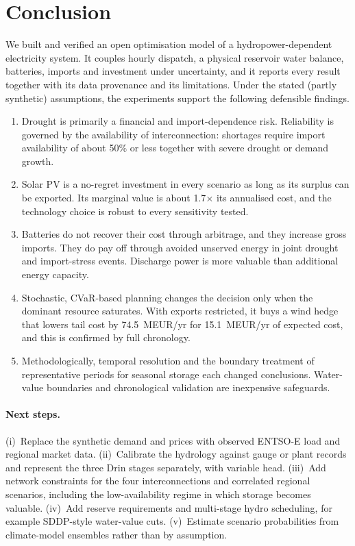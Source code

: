 \section{Conclusion}
\label{sec:conclusion}

We built and verified an open optimisation model of a hydropower-dependent electricity system. It couples
hourly dispatch, a physical reservoir water balance, batteries, imports and investment under uncertainty,
and it reports every result together with its data provenance and its limitations. Under the stated (partly
synthetic) assumptions, the experiments support the following defensible findings.
\begin{enumerate}
\item Drought is primarily a financial and import-dependence risk. Reliability is governed by the
availability of interconnection: shortages require import availability of about 50\% or less together with
severe drought or demand growth.
\item Solar PV is a no-regret investment in every scenario as long as its surplus can be exported. Its
marginal value is about 1.7$\times$ its annualised cost, and the technology choice is robust to every
sensitivity tested.
\item Batteries do not recover their cost through arbitrage, and they increase gross imports. They do pay
off through avoided unserved energy in joint drought and import-stress events. Discharge power is more
valuable than additional energy capacity.
\item Stochastic, CVaR-based planning changes the decision only when the dominant resource saturates. With
exports restricted, it buys a wind hedge that lowers tail cost by 74.5~MEUR/yr for 15.1~MEUR/yr of expected
cost, and this is confirmed by full chronology.
\item Methodologically, temporal resolution and the boundary treatment of representative periods for
seasonal storage each changed conclusions. Water-value boundaries and chronological validation are
inexpensive safeguards.
\end{enumerate}

\paragraph{Next steps.} (i)~Replace the synthetic demand and prices with observed ENTSO-E load and regional
market data. (ii)~Calibrate the hydrology against gauge or plant records and represent the three Drin stages
separately, with variable head. (iii)~Add network constraints for the four interconnections and correlated
regional scenarios, including the low-availability regime in which storage becomes valuable. (iv)~Add
reserve requirements and multi-stage hydro scheduling, for example SDDP-style water-value cuts. (v)~Estimate
scenario probabilities from climate-model ensembles rather than by assumption.
